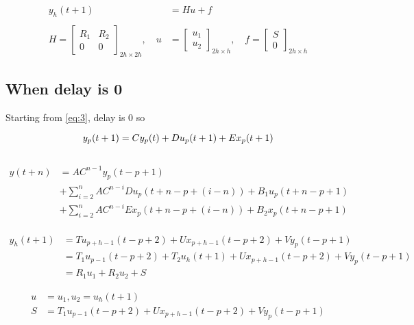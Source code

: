 \documentclass{article}
\begin{document}
\begin{align*}
	y_h(t+1) &= Hu + f\\\\
	H = 
	\begin{bmatrix}
		R_1 & R_2 \\
		0 & 0
	\end{bmatrix}_{2h \times 2h}
	,\quad
	u &=
	\begin{bmatrix}
		u_1\\
		u_2
	\end{bmatrix}_{2h \times h}
	,\quad
	f = 
	\begin{bmatrix}
		S\\
		0
	\end{bmatrix}_{2h \times h}
\end{align*}





\subsection{When delay is 0}

Starting from \eqref{eq:3}, delay is 0 so 

\begin{equation} \label{eq:5}
\\
	y_p(t+1) = Cy_p(t) + Du_p(t+1) + Ex_p(t+1)
\end{equation}
\\

\begin{align*}
	y(t+n) &= AC^{n-1}y_p(t-p+1)\\
	&+ \sum_{i=2}^{n} AC^{n-i}Du_p(t+n-p+(i-n)) + B_1u_p(t+n-p+1)\\
	&+ \sum_{i=2}^{n} AC^{n-i}Ex_p(t+n-p+(i-n)) + B_2x_p(t+n-p+1)
\end{align*}
\\


\begin{align*}
	y_h(t+1) &= Tu_{p+h-1}(t-p+2) + Ux_{p+h-1}(t-p+2) + Vy_p(t-p+1)\\
	&= T_1u_{p-1}(t-p+2)+ T_2u_{h}(t+1) + Ux_{p+h-1}(t-p+2) + Vy_p(t-p+1)\\
	& = R_1u_1 + R_2u_2 + S
\end{align*}

\begin{align*}
	u &= u_1, u_2 = u_h(t+1)\\
	S &= T_1u_{p-1}(t-p+2) + Ux_{p+h-1}(t-p+2) + Vy_p(t-p+1)
\end{align*}
\end{document}
